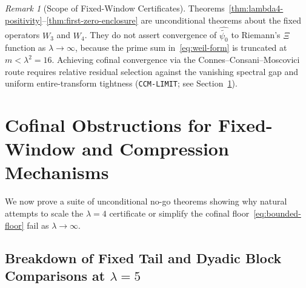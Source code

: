 \documentclass[11pt]{article}
\theoremstyle{remark}
\newtheorem{remark}[theorem]{Remark}
\begin{document}
\begin{remark}[Scope of Fixed-Window Certificates]
Theorems~\ref{thm:lambda4-positivity}--\ref{thm:first-zero-enclosure} are unconditional theorems about the fixed operators $W_3$ and $W_4$. They do not assert convergence of $\widehat{\widetilde{\psi_0}}$ to Riemann's $\Xi$ function as $\lambda \to \infty$, because the prime sum in~\eqref{eq:weil-form} is truncated at $m < \lambda^2 = 16$. Achieving cofinal convergence via the Connes--Consani--Moscovici route requires relative residual selection against the vanishing spectral gap and uniform entire-transform tightness (\texttt{CCM-LIMIT}; see Section~\ref{sec:obstructions}).
\end{remark}

\section{Cofinal Obstructions for Fixed-Window and Compression Mechanisms}
\label{sec:obstructions}

We now prove a suite of unconditional no-go theorems showing why natural attempts to scale the $\lambda = 4$ certificate or simplify the cofinal floor~\eqref{eq:bounded-floor} fail as $\lambda \to \infty$.

\subsection{Breakdown of Fixed Tail and Dyadic Block Comparisons at \texorpdfstring{$\lambda = 5$}{lambda = 5}}
\end{document}
